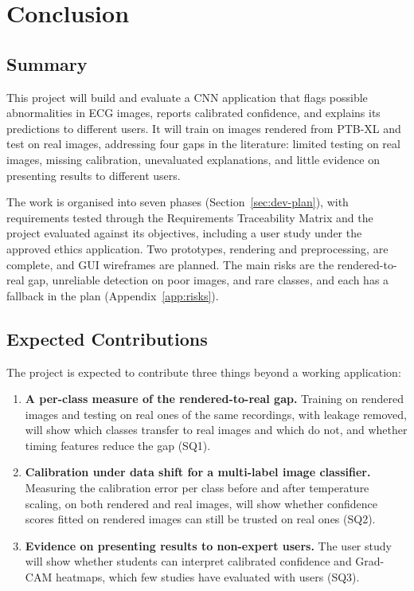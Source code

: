 \chapter{Conclusion}
\label{ch:conc}

\section{Summary}
\label{sec:conc-summary}

This project will build and evaluate a CNN application that flags possible abnormalities in ECG images, reports calibrated confidence, and explains its predictions to different users. It will train on images rendered from PTB-XL and test on real images, addressing four gaps in the literature: limited testing on real images, missing calibration, unevaluated explanations, and little evidence on presenting results to different users.

The work is organised into seven phases (Section~\ref{sec:dev-plan}), with requirements tested through the Requirements Traceability Matrix and the project evaluated against its objectives, including a user study under the approved ethics application. Two prototypes, rendering and preprocessing, are complete, and GUI wireframes are planned. The main risks are the rendered-to-real gap, unreliable detection on poor images, and rare classes, and each has a fallback in the plan (Appendix~\ref{app:risks}).

\section{Expected Contributions}
\label{sec:contributions}

The project is expected to contribute three things beyond a working application:
\begin{enumerate}\setlength{\itemsep}{0pt}\setlength{\parskip}{0pt}
  \item \textbf{A per-class measure of the rendered-to-real gap.} Training on rendered images and testing on real ones of the same recordings, with leakage removed, will show which classes transfer to real images and which do not, and whether timing features reduce the gap (SQ1).
  \item \textbf{Calibration under data shift for a multi-label image classifier.} Measuring the calibration error per class before and after temperature scaling, on both rendered and real images, will show whether confidence scores fitted on rendered images can still be trusted on real ones (SQ2).
  \item \textbf{Evidence on presenting results to non-expert users.} The user study will show whether students can interpret calibrated confidence and Grad-CAM heatmaps, which few studies have evaluated with users (SQ3).
\end{enumerate}

